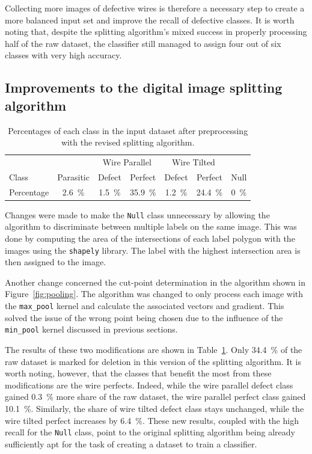 Collecting more images of defective wires is therefore a necessary step to create a more balanced input set and improve the recall of defective classes. It is worth noting that, despite the splitting algorithm's mixed success in properly processing half of the raw dataset, the classifier still managed to assign four out of six classes with very high accuracy.

\subsection{Improvements to the digital image splitting algorithm}

\begin{table}
    \centering
    \caption[Percentages of each class in the input dataset after preprocessing with the revised splitting algorithm.]{Percentages of each class in the input dataset after preprocessing with the revised splitting algorithm.}
    \begin{tabular}{l|c|c c|c c|c}
        & & \multicolumn{2}{c|}{Wire Parallel} & \multicolumn{2}{c|}{Wire Tilted} & \\ 
        Class & Parasitic & Defect & Perfect & Defect & Perfect & Null \\ \hline \hline
        Percentage & \qty{2.6}{\%} & \qty{1.5}{\%} & \qty{35.9}{\%} & \qty{1.2}{\%} &\qty{24.4}{\%} & \qty{0}{\%}
    \end{tabular}
    \label{tab:class_makeup2}
\end{table}

Changes were made to make the \texttt{Null} class unnecessary by allowing the algorithm to discriminate between multiple labels on the same image. This was done by computing the area of the intersections of each label polygon with the images using the \texttt{shapely} \cite{gillies_2024} library. The label with the highest intersection area is then assigned to the image.

Another change concerned the cut-point determination in the algorithm shown in Figure~\ref{fig:pooling}. The algorithm was changed to only process each image with the \texttt{max\_pool} kernel and calculate the associated vectors and gradient. This solved the issue of the wrong point being chosen due to the influence of the \texttt{min\_pool} kernel discussed in previous sections.

The results of these two modifications are shown in Table~\ref{tab:class_makeup2}. Only \qty{34.4}{\%} of the raw dataset is marked for deletion in this version of the splitting algorithm. It is worth noting, however, that the classes that benefit the most from these modifications are the wire perfects. Indeed, while the wire parallel defect class gained \qty{0.3}{\%} more share of the raw dataset, the wire parallel perfect class gained \qty{10.1}{\%}. Similarly, the share of wire tilted defect class stays unchanged, while the wire tilted perfect increases by \qty{6.4}{\%}. These new results, coupled with the high recall for the \texttt{Null} class, point to the original splitting algorithm being already sufficiently apt for the task of creating a dataset to train a classifier.

